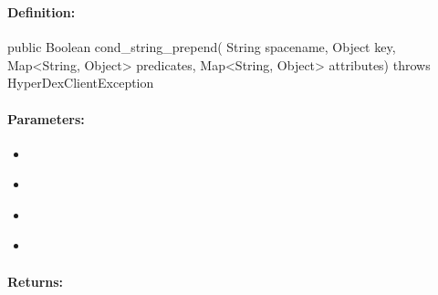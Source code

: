 \pagebreak
\subsubsection{}
\label{api:java:cond_string_prepend}


\paragraph{Definition:}
\begin{javacode}
public Boolean cond_string_prepend(
        String spacename,
        Object key,
        Map<String, Object> predicates,
        Map<String, Object> attributes) throws HyperDexClientException
\end{javacode}

\paragraph{Parameters:}
\begin{itemize}[noitemsep]
\item {}\\

\item {}\\

\item {}\\

\item {}\\

\end{itemize}

\paragraph{Returns:}


\pagebreak
\subsubsection{}
\label{api:java:async_cond_string_prepend}


